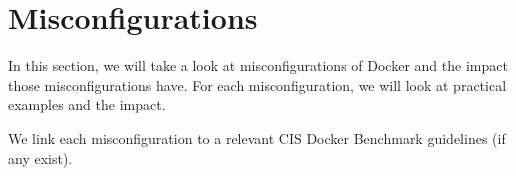 \section{Misconfigurations}\label{section:misconfigurations}
In this section, we will take a look at misconfigurations of Docker and the impact those misconfigurations have. For each misconfiguration, we will look at practical examples and the impact.

\medskip

We link each misconfiguration to a relevant CIS Docker Benchmark guidelines (if any exist).








